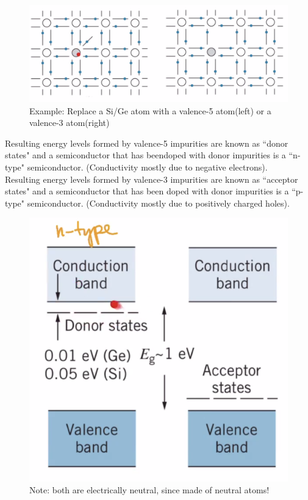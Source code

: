 \documentclass[class=article,crop=false]{standalone}
\begin{document}
\begin{figure}[h!]
	\centering
	\includegraphics[width=.8\linewidth]{./Images/replace.png}
	\caption{Example: Replace a Si/Ge atom with a valence-5 atom(left) or a valence-3 atom(right)}
\end{figure}

Resulting energy levels formed by valence-5 impurities are known as ``donor states" and a semiconductor that has beendoped with donor impurities is a ``n-type" semiconductor. (Conductivity mostly due to negative electrons).\\

Resulting energy levels formed by valence-3 impurities are known as ``acceptor states" and a semiconductor that has been doped with donor impurities is a ``p-type" semiconductor. (Conductivity mostly due to positively charged holes).\\

\begin{figure}[h!]
	\centering
	\includegraphics[width=.8\linewidth]{./Images/doping.png}
	\caption{Note: both are electrically neutral, since made of neutral atoms!}
\end{figure}
\end{document}
